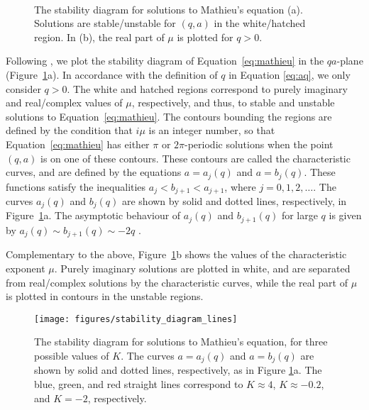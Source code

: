 \begin{figure}[!ht]
\centering
{}
\\
\caption{The stability diagram for solutions to Mathieu's equation (a).
Solutions are stable/unstable for $(q, a)$ in the white/hatched region.
In (b), the real part of $\mu$ is plotted for $q > 0$.}
\label{fig:stability_diagram}
\end{figure}

Following \cite{McLachlan1946}, we plot the stability diagram of Equation~\eqref{eq:mathieu} in the $qa$\/-plane (Figure~\ref{fig:stability_diagram}a).
In accordance with the definition of $q$ in Equation \eqref{eq:aq}, we only consider $q > 0$.
The white and hatched regions correspond to purely imaginary and real/complex values of $\mu$, respectively, and thus, to stable and unstable solutions to Equation~\eqref{eq:mathieu}.
The contours bounding the regions are defined by the condition that $i\mu$ is an integer number, so that Equation~\eqref{eq:mathieu} has either $\pi$ or $2\pi$\/-periodic solutions when the point $(q,a)$ is on one of these contours.
These contours are called the characteristic curves, and are defined by the equations $a = a_j(q)$ and $a = b_j(q)$.
These functions satisfy the inequalities $a_j < b_{j+1} < a_{j+1}$\/, where $j = 0,1,2,\dots$.
The curves $a_j(q)$ and $b_j(q)$ are shown by solid and dotted lines, respectively, in Figure~\ref{fig:stability_diagram}a. The asymptotic behaviour of $a_j(q)$ and $b_{j+1}(q)$ for large $q$ is given by $a_j(q) \sim b_{j+1}(q) \sim -2q$ \citep{Abramowitz1965}.

Complementary to the above, Figure~\ref{fig:stability_diagram}b shows the values of the characteristic exponent $\mu$. Purely imaginary solutions are plotted in white, and are separated from real/complex solutions by the characteristic curves, while the real part of $\mu$ is plotted in contours in the unstable regions.

\begin{figure}[t]
\centering
\texttt{[image: figures/stability\_diagram\_lines]}
\caption{The stability diagram for solutions to Mathieu's equation, for three possible values of $K$.
The curves $a = a_j(q)$ and $a = b_j(q)$ are shown by solid and dotted lines, respectively, as in Figure \ref{fig:stability_diagram}a.
The blue, green, and red straight lines correspond to $K \approx 4$, $K \approx - 0.2$, and $K = -2$, respectively.}
\label{fig:stability_diagram_lines}
\end{figure}


